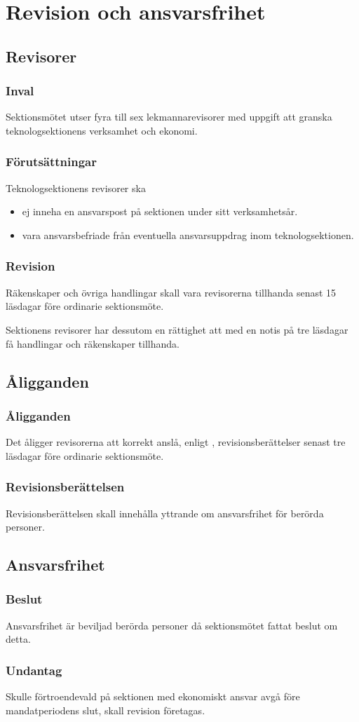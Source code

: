 \section{Revision och ansvarsfrihet}

\subsection{Revisorer}

\subsubsection{Inval}
Sektionsmötet utser fyra till sex lekmannarevisorer med uppgift att granska teknologsektionens verksamhet och ekonomi.

\subsubsection{Förutsättningar}
Teknologsektionens revisorer ska 
\begin{itemize}
    \item ej inneha en ansvarspost på sektionen under sitt verksamhetsår.
    \item vara ansvarsbefriade från eventuella ansvarsuppdrag inom teknologsektionen. 
\end{itemize} 

\subsubsection{Revision}
Räkenskaper och övriga handlingar skall vara revisorerna tillhanda senast 15 läsdagar före ordinarie sektionsmöte. 

Sektionens revisorer har dessutom en rättighet att med en notis på tre läsdagar få handlingar och räkenskaper tillhanda. 

\subsection{Åligganden}

\subsubsection{Åligganden}
Det åligger revisorerna att korrekt anslå, enligt , revisionsberättelser senast tre läsdagar före ordinarie sektionsmöte.

\subsubsection{Revisionsberättelsen}
Revisionsberättelsen skall innehålla yttrande om ansvarsfrihet för berörda personer.

\subsection{Ansvarsfrihet}

\subsubsection{Beslut}
Ansvarsfrihet är beviljad berörda personer då sektionsmötet fattat beslut om detta.

\subsubsection{Undantag}
Skulle förtroendevald på sektionen med ekonomiskt ansvar avgå före mandatperiodens slut, skall revision företagas.